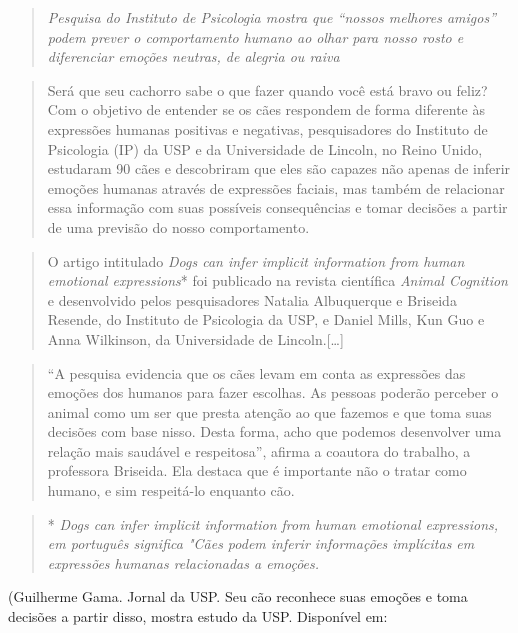 \begin{quote}
\emph{Pesquisa do Instituto de Psicologia mostra que ``nossos melhores
amigos'' podem prever o comportamento humano ao olhar para nosso rosto e
diferenciar emoções neutras, de alegria ou raiva}
\end{quote}

\begin{quote}
Será que seu cachorro sabe o que fazer quando você está bravo ou feliz?
Com o objetivo de entender se os cães respondem de forma diferente às
expressões humanas positivas e negativas, pesquisadores do Instituto de
Psicologia (IP) da USP e da Universidade de Lincoln, no Reino Unido,
estudaram 90 cães e descobriram que eles são capazes não apenas de
inferir emoções humanas através de expressões faciais, mas também de
relacionar essa informação com suas possíveis consequências e tomar
decisões a partir de uma previsão do nosso comportamento.
\end{quote}

\begin{quote}
O artigo intitulado \emph{Dogs can infer implicit information from human
emotional expressions}* foi publicado na revista científica \emph{Animal
Cognition} e desenvolvido pelos pesquisadores Natalia Albuquerque e
Briseida Resende, do Instituto de Psicologia da USP, e Daniel Mills, Kun
Guo e Anna Wilkinson, da Universidade de Lincoln.{[}\ldots{}{]}
\end{quote}

\begin{quote}
``A pesquisa evidencia que os cães levam em conta as expressões das
emoções dos humanos para fazer escolhas. As pessoas poderão perceber o
animal como um ser que presta atenção ao que fazemos e que toma suas
decisões com base nisso. Desta forma, acho que podemos desenvolver uma
relação mais saudável e respeitosa'', afirma a coautora do trabalho, a
professora Briseida. Ela destaca que é importante não o tratar como
humano, e sim respeitá-lo enquanto cão.
\end{quote}

\begin{quote}
* \emph{Dogs can infer implicit information from human emotional
expressions, em português significa "Cães podem inferir informações
implícitas em expressões humanas relacionadas a emoções.}
\end{quote}

(Guilherme Gama. Jornal da USP. Seu cão reconhece suas emoções e toma
decisões a partir disso, mostra estudo da USP. Disponível em:


